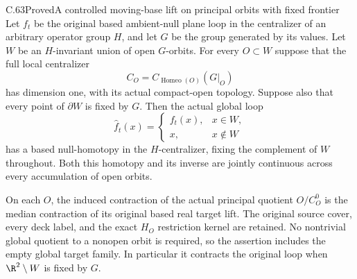 \begin{claim}{C.63}{Proved}{A controlled moving-base lift on principal orbits with fixed frontier}
Let $f_t$ be the original based ambient-null plane loop in
the centralizer of an arbitrary operator group $H$, and let
$G$ be the group generated by its values. Let $W$ be an
$H$-invariant union of open $G$-orbits. For every $O\subset W$
suppose that the full local centralizer
\[
 C_O=C_{\operatorname{Homeo}(O)}(G|_O)
\]
has dimension one, with its actual compact-open topology.
Suppose also that every point of $\partial W$ is fixed by $G$.
Then the actual global loop
\[
 \widehat f_t(x)=
 \begin{cases}f_t(x),&x\in W,\\x,&x\notin W\end{cases}
                                                               \tag{C.63.1}
\]
has a based null-homotopy in the $H$-centralizer, fixing the
complement of $W$ throughout. Both this homotopy and its
inverse are jointly continuous across every accumulation
of open orbits.

On each $O$, the induced contraction of the actual principal
quotient $O/C_O^0$ is the median contraction of its original
based real target lift. The original source cover, every
deck label, and the exact $H_O$ restriction kernel are
retained. No nontrivial global quotient to a nonopen orbit
is required, so the assertion includes the empty global
target family. In particular it contracts the original
loop when $\R^2\setminus W$ is fixed by $G$.
\end{claim}

